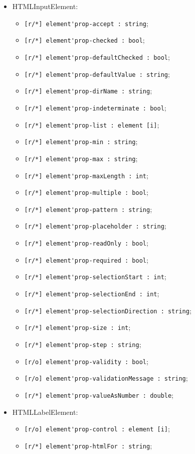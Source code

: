 \documentclass[a4paper, 14pt]{extarticle}
\newenvironment{icItems}
	{ \begin{itemize} [noitemsep,nolistsep] }
	{ \end{itemize} }
\begin{document}
\begin{icItems}
	\item HTMLInputElement:
	\begin{icItems}
		\item \lstinline|[r/*] element'prop-accept : string|;
		\item \lstinline|[r/*] element'prop-checked : bool|;
		\item \lstinline|[r/*] element'prop-defaultChecked : bool|;
		\item \lstinline|[r/*] element'prop-defaultValue : string|;
		\item \lstinline|[r/*] element'prop-dirName : string|;
		\item \lstinline|[r/*] element'prop-indeterminate : bool|;
		\item \lstinline|[r/*] element'prop-list : element [i]|;
		\item \lstinline|[r/*] element'prop-min : string|;
		\item \lstinline|[r/*] element'prop-max : string|;
		\item \lstinline|[r/*] element'prop-maxLength : int|;
		\item \lstinline|[r/*] element'prop-multiple : bool|;
		\item \lstinline|[r/*] element'prop-pattern : string|;
		\item \lstinline|[r/*] element'prop-placeholder : string|;
		\item \lstinline|[r/*] element'prop-readOnly : bool|;
		\item \lstinline|[r/*] element'prop-required : bool|;
		\item \lstinline|[r/*] element'prop-selectionStart : int|;
		\item \lstinline|[r/*] element'prop-selectionEnd : int|;
		\item \lstinline|[r/*] element'prop-selectionDirection : string|;
		\item \lstinline|[r/*] element'prop-size : int|;
		\item \lstinline|[r/*] element'prop-step : string|;
		\item \lstinline|[r/o] element'prop-validity : bool|;
		\item \lstinline|[r/o] element'prop-validationMessage : string|;
		\item \lstinline|[r/*] element'prop-valueAsNumber : double|;
	\end{icItems}
	
	\item HTMLLabelElement:
	\begin{icItems}
		\item \lstinline|[r/o] element'prop-control : element [i]|;
		\item \lstinline|[r/*] element'prop-htmlFor : string|;
	\end{icItems}
	

\end{icItems}
\end{document}
